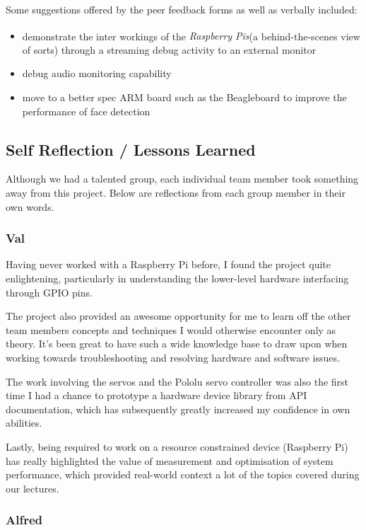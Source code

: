 \documentclass[11pt,a4paper,titlepage]{report}
\newcommand{\rpis}{\textit{Raspberry Pi\textsuperscript{\textregistered}s}}
\begin{document}
Some suggestions offered by the peer feedback forms as well as verbally included:

\begin{itemize}
    \item demonstrate the inter workings of the \rpis\xspace (a behind-the-scenes view of sorts) through a streaming debug activity to an external monitor
    \item debug audio monitoring capability
    \item move to a better spec ARM board such as the Beagleboard to improve the performance of face detection
\end{itemize}



\subsection{Self Reflection / Lessons Learned}

Although we had a talented group, each individual team member took something away from this project. Below are reflections from each group member in their own words.

\subsubsection{Val}

Having never worked with a Raspberry Pi before, I found the project quite enlightening, particularly in understanding the lower-level hardware interfacing through GPIO pins. 

The project also provided an awesome opportunity for me to learn off the other team members concepts and techniques I would otherwise encounter only as theory. It's been great to have such a wide knowledge base to draw upon when working towards troubleshooting and resolving hardware and software issues.

The work involving the servos and the Pololu servo controller was also the first time I had a chance to prototype a hardware device library from API documentation, which has subsequently greatly increased my confidence in own abilities.

Lastly, being required to work on a resource constrained device (Raspberry Pi) has really highlighted the value of measurement and optimisation of system performance, which provided real-world context a lot of the topics covered during our lectures.

\subsubsection{Alfred}
\end{document}
